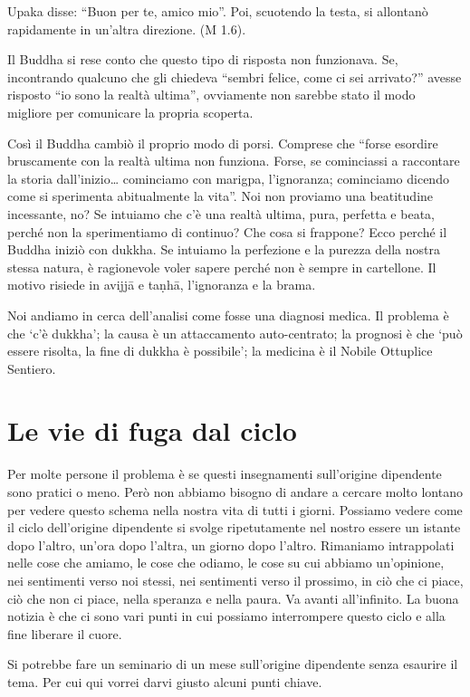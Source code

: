 Upaka disse: ``Buon per te, amico mio''. Poi, scuotendo la testa, si allontanò rapidamente in un'altra direzione. (M 1.6).

Il Buddha si rese conto che questo tipo di risposta non funzionava. Se, incontrando qualcuno che gli chiedeva ``sembri felice, come ci sei arrivato?'' avesse risposto ``io sono la realtà ultima'', ovviamente non sarebbe stato il modo migliore per comunicare la propria scoperta.

Così il Buddha cambiò il proprio modo di porsi. Comprese che ``forse esordire bruscamente con la realtà ultima non funziona. Forse, se cominciassi a raccontare la storia dall'inizio\ldots{} cominciamo con marigpa, l'ignoranza; cominciamo dicendo come si sperimenta abitualmente la vita''. Noi non proviamo una beatitudine incessante, no? Se intuiamo che c'è una realtà ultima, pura, perfetta e beata, perché non la sperimentiamo di continuo? Che cosa si frappone? Ecco perché il Buddha iniziò con dukkha. Se intuiamo la perfezione e la purezza della nostra stessa natura, è ragionevole voler sapere perché non è sempre in cartellone. Il motivo risiede in avijjā e taṇhā, l'ignoranza e la brama.

Noi andiamo in cerca dell'analisi come fosse una diagnosi medica. Il problema è che `c'è dukkha'; la causa è un attaccamento auto-centrato; la prognosi è che `può essere risolta, la fine di dukkha è possibile'; la medicina è il Nobile Ottuplice Sentiero.

\section*{Le vie di fuga dal ciclo} 

Per molte persone il problema è se questi insegnamenti sull'origine dipendente sono pratici o meno. Però non abbiamo bisogno di andare a cercare molto lontano per vedere questo schema nella nostra vita di tutti i giorni. Possiamo vedere come il ciclo dell'origine dipendente si svolge ripetutamente nel nostro essere un istante dopo l'altro, un'ora dopo l'altra, un giorno dopo l'altro. Rimaniamo intrappolati nelle cose che amiamo, le cose che odiamo, le cose su cui abbiamo un'opinione, nei sentimenti verso noi stessi, nei sentimenti verso il prossimo, in ciò che ci piace, ciò che non ci piace, nella speranza e nella paura. Va avanti all'infinito. La buona notizia è che ci sono vari punti in cui possiamo interrompere questo ciclo e alla fine liberare il cuore.

Si potrebbe fare un seminario di un mese sull'origine dipendente senza esaurire il tema. Per cui qui vorrei darvi giusto alcuni punti chiave. 


